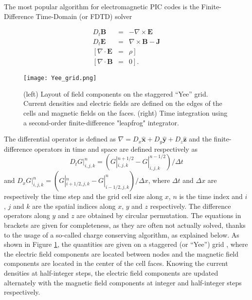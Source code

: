 

The most popular algorithm for electromagnetic PIC codes is the Finite-Difference
Time-Domain (or FDTD) solver

\begin{subequations}
\begin{eqnarray}
D_{t}\mathbf{B} & = & -\nabla\times\mathbf{E}\label{Eq:Faraday-2}\\
D_{t}\mathbf{E} & = & \nabla\times\mathbf{B}-\mathbf{J}\label{Eq:Ampere-2}\\
\left[\nabla\cdot\mathbf{E}\right. & = & \left.\rho\right]\label{Eq:Gauss-2}\\
\left[\nabla\cdot\mathbf{B}\right. & = & \left.0\right].\label{Eq:divb-2}
\end{eqnarray}
\end{subequations}

\begin{figure}
\texttt{[image: Yee\_grid.png]}
\caption{\label{fig:yee_grid}(left) Layout of field components on the staggered ``Yee'' grid. Current densities and electric fields are defined on the edges of the cells and magnetic fields on the faces. (right) Time integration using a second-order finite-difference "leapfrog" integrator.}
\end{figure}

The differential operator is defined as $\nabla=D_{x}\mathbf{\hat{x}}+D_{y}\mathbf{\hat{y}}+D_{z}\mathbf{\hat{z}}$
and the finite-difference operators in time and space are defined
respectively as $$D_{t}G|_{i,j,k}^{n}=\left(G|_{i,j,k}^{n+1/2}-G|_{i,j,k}^{n-1/2}\right)/\Delta t$$
and $D_{x}G|_{i,j,k}^{n}=\left(G|_{i+1/2,j,k}^{n}-G|_{i-1/2,j,k}^{n}\right)/\Delta x$,
where $\Delta t$ and $\Delta x$ are respectively the time step and
the grid cell size along $x$, $n$ is the time index and $i$, $j$
and $k$ are the spatial indices along $x$, $y$ and $z$ respectively.
The difference operators along $y$ and $z$ are obtained by circular
permutation. The equations in brackets are given for completeness,
as they are often not actually solved, thanks to the usage of a so-called
charge conserving algorithm, as explained below. As shown in Figure
\ref{fig:yee_grid}, the quantities are given on a staggered (or ``Yee'')
grid \cite{Yee}, where the electric field components are located
between nodes and the magnetic field components are located in the
center of the cell faces. Knowing the current densities at half-integer steps, 
the electric field components are updated alternately with the magnetic 
field components at integer and half-integer steps respectively.
